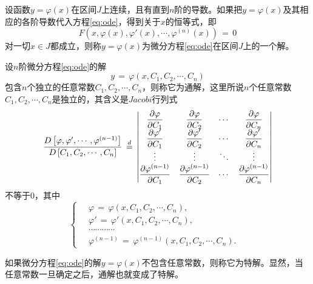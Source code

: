 \begin{defn}[常微分方程的解]\label{def:odesol}
设函数$y=\varphi(x)$在区间$J$上连续，且有直到$n$阶的导数。如果把$y=\varphi(x)$及其相应的各阶导数代入方程\eqref{eq:ode}，得到关于$x$的恒等式，即
\begin{equation}\label{eq:odesol}
F(x,\varphi(x),\varphi'(x),\cdots,\varphi^{(n)}(x))\,=\,0
\end{equation}
对一切$x\in J$都成立，则称$y=\varphi(x)$为微分方程\eqref{eq:ode}在区间$J$上的一个{\heiti 解}。
\end{defn}
\begin{defn}[常微分方程的通解与特解]\label{def:odesol:genspec}
设$n$阶微分方程\eqref{eq:ode}的解
\begin{equation}\label{eq:odesol:genspec}
y\,=\,\varphi(x,C_1,C_2,\cdots,C_n)
\end{equation}
包含$n$个{\heiti 独立的}任意常数$C_1,C_2,\cdots,C_n$，则称它为{\heiti 通解}，这里所说$n$个任意常数$C_1,C_2,\cdots,C_n$是独立的，其含义是$Jacobi$行列式
$$
\frac{D\left[\varphi,\varphi',\cdots,\varphi^{(n-1)}\right]}{D\left[C_1,C_2,\cdots,C_n\right]}\,\overset{d}{=}\,
\def\tmp#1#2{\dfrac{\partial #1}{\partial C_{#2}}}
\left|
\begin{matrix}
\tmp{\varphi}{1} & \tmp{\varphi}{2} & \cdots & \tmp{\varphi}{n} \\
\tmp{\varphi'}{1} & \tmp{\varphi'}{2} & \cdots & \tmp{\varphi'}{n} \\
\vdots & \vdots & \ddots & \vdots \\
\tmp{\varphi^{(n-1)}}{1} & \tmp{\varphi^{(n-1)}}{2} & \cdots & \tmp{\varphi^{(n-1)}}{n} \\
\end{matrix}
\right|
\let\tmp\relax
$$
不等于0，其中
\begin{equation*}
    \begin{cases}
    \quad\varphi\,=\,\varphi(x,C_1,C_2,\cdots,C_n), & \\
    \quad\varphi'\,=\,\varphi'(x,C_1,C_2,\cdots,C_n), & \\
    \quad\cdots\cdots\cdots\cdots & \\
    \quad\varphi^{(n-1)}\,=\,\varphi^{(n-1)}(x,C_1,C_2,\cdots,C_n). &
    \end{cases}
\end{equation*}\par
如果微分方程\eqref{eq:ode}的解$y=\varphi(x)$不包含任意常数，则称它为{\heiti 特解}。显然，当任意常数一旦确定之后，通解也就变成了特解。
\end{defn}


